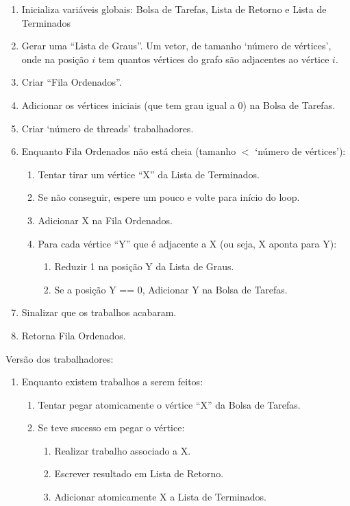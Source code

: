 \documentclass[12pt]{article}
\begin{document}
\begin{enumerate}
	\item Inicializa variáveis globais:
		Bolsa de Tarefas, Lista de Retorno e Lista de Terminados
	\item Gerar uma ``Lista de Graus''.
		Um vetor, de tamanho `número de vértices',
		onde na posição $i$ tem quantos vértices do grafo são adjacentes
		ao vértice $i$.
	\item Criar ``Fila Ordenados''.
	\item Adicionar os vértices iniciais (que tem grau igual a 0)
		na Bolsa de Tarefas.
	\item Criar `número de threads' trabalhadores.
	\item Enquanto Fila Ordenados não está cheia
		(tamanho $<$ `número de vértices'):
	\begin{enumerate}
		\item Tentar tirar um vértice ``X'' da Lista de Terminados.
		\item Se não conseguir, espere um pouco e volte para início do loop.
		\item Adicionar X na Fila Ordenados.
		\item Para cada vértice ``Y'' que é adjacente a X
			(ou seja, X aponta para Y):
		\begin{enumerate}
			\item Reduzir 1 na posição Y da Lista de Graus.
			\item Se a posição Y == 0, Adicionar Y na Bolsa de Tarefas.
		\end{enumerate}
	\end{enumerate}
	\item Sinalizar que os trabalhos acabaram.
	\item Retorna Fila Ordenados.
\end{enumerate}

Versão dos trabalhadores:

\begin{enumerate}
	\item Enquanto existem trabalhos a serem feitos:
	\begin{enumerate}
		\item Tentar pegar atomicamente o vértice ``X''
			da Bolsa de Tarefas.
		\item Se teve sucesso em pegar o vértice:
		\begin{enumerate}
			\item Realizar trabalho associado a X.
			\item Escrever resultado em Lista de Retorno.
			\item Adicionar atomicamente X a Lista de Terminados.
		\end{enumerate}
	\end{enumerate}
\end{enumerate}
\end{document}
